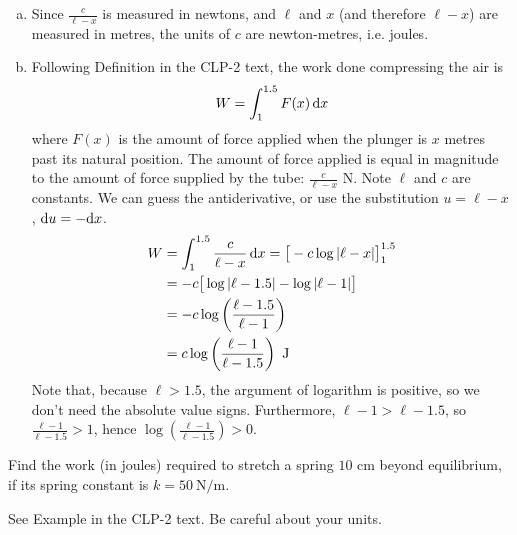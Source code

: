 \begin{solution}
\begin{enumerate}[(a)]
\item Since $\frac{c}{\ell-x}$ is measured in newtons, and $\ell$ and $x$ (and therefore $\ell-x$) are measured in metres, the units of $c$ are newton-metres, i.e. joules.
\item Following Definition  in the CLP-2 text, the work done compressing the air is
\[W = \int_1^{1.5}F(x)\,\mathrm{d}x\]
where $F(x)$ is the amount of force applied when the plunger is $x$ metres past its natural position. The amount of force applied is equal in magnitude to the amount of force supplied by the tube: $\frac{c}{\ell-x}$ N. Note $\ell$ and $c$ are constants. We can guess the antiderivative, or use the substitution $u=\ell-x$, $\mathrm{d}u=-\mathrm{d}x$.
\begin{align*}
W &=\int_1^{1.5} \frac{c}{\ell-x}\,\mathrm{d}x  = \big[-c\log|\ell-x|\big]_1^{1.5}\\
&=-c\big[\log|\ell-1.5| - \log|\ell-1|\big]\\
&=-c\log\left(\frac{\ell-1.5}{\ell-1}\right)\\
&=c\log\left(\frac{\ell-1}{\ell-1.5}\right)\text{ J}\end{align*}
Note that, because $\ell>1.5$, the argument of logarithm is positive, so we don't need the absolute value signs. Furthermore, $\ell-1 > \ell-1.5$, so $\frac{\ell-1}{\ell-1.5}>1$, hence $\log\left(\frac{\ell-1}{\ell-1.5}\right)>0$.
\end{enumerate}
\end{solution}





\begin{question}[2016Q3]\label{prob_s2.1:normal1}
Find the work (in joules) required to stretch a spring $10$ cm beyond
equilibrium, if its spring constant is $k=50\ \mathrm{N}/\mathrm{m}$.
\end{question}

\begin{hint}
See Example  in the
CLP-2 text. Be careful about your units.
\end{hint}

